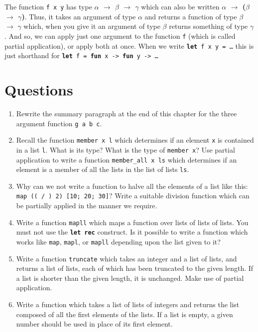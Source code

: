 \documentclass[]{book}
\begin{document}
The function \texttt{f x y} has type \textsf{\textbf{$\alpha$ $\rightarrow$ $\beta$ $\rightarrow$ $\gamma$}} which can also be written \textsf{\textbf{$\alpha$ $\rightarrow$ \textmd{(}$\beta$ $\rightarrow$ $\gamma$\textmd{)}}}. Thus, it takes an argument of type $\alpha$ and returns a function of type $\beta$ $\rightarrow$ $\gamma$ which, when you give it an argument of type $\beta$ returns something of type $\gamma$. And so, we can apply just one argument to the function \texttt{f} (which is called partial application), or apply both at once. When we write \textbf{\texttt{let}}\texttt{ f x y = \ldots} this is just shorthand for \textbf{\texttt{let}}\texttt{ f = }\textbf{\texttt{fun}}\texttt{ x -> }\textbf{\texttt{fun}}\texttt{ y -> \ldots}
 
\clearpage
\section*{Questions}

\begin{enumerate}
  \item Rewrite the summary paragraph at the end of this chapter for the three argument function \texttt{g a b c}.
  \item Recall the function \texttt{member x l} which determines if an element \texttt{x} is contained in a list \texttt{l}. What is its type? What is the type of \texttt{member x}? Use partial application to write a function \texttt{member\_all x ls} which determines if an element is a member of all the lists in the list of lists \texttt{ls}. 
  \item Why can we not write a function to halve all the elements of a list like this: \texttt{map (( / ) 2) [10; 20; 30]}? Write a suitable division function which can be partially applied in the manner we require.
  \item Write a function \texttt{mapll} which maps a function over lists of lists of lists. You must not use the \textbf{\texttt{let rec}} construct. Is it possible to write a function which works like \texttt{map}, \texttt{mapl}, or \texttt{mapll} depending upon the list given to it?
  \item Write a function \texttt{truncate} which takes an integer and a list of lists, and returns a list of lists, each of which has been truncated to the given length. If a list is shorter than the given length, it is unchanged. Make use of partial application.
  \item Write a function which takes a list of lists of integers and returns the list composed of all the first elements of the lists. If a list is empty, a given number should be used in place of its first element.
\end{enumerate}
\end{document}

